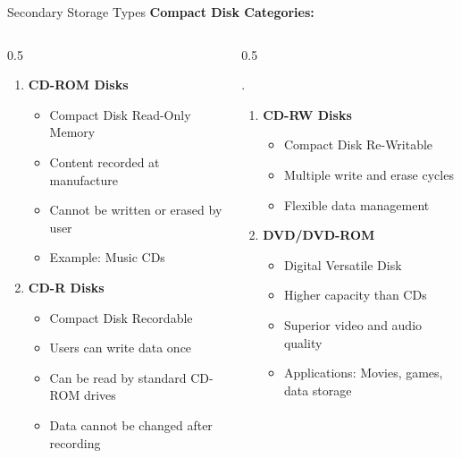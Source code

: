 \documentclass[aspectratio=169]{beamer}
\begin{document}
\begin{frame}{Secondary Storage Types}
    \textbf{Compact Disk Categories:}

    \begin{columns}
        \begin{column}{0.5\textwidth}

   \begin{enumerate}
        \item[1.] \textbf{CD-ROM Disks}
        \begin{itemize}
            \item Compact Disk Read-Only Memory
            \item Content recorded at manufacture
            \item Cannot be written or erased by user
            \item Example: Music CDs
        \end{itemize}
        
        \item[2.] \textbf{CD-R Disks}
        \begin{itemize}
            \item Compact Disk Recordable
            \item Users can write data once
            \item Can be read by standard CD-ROM drives
            \item Data cannot be changed after recording
        \end{itemize}
        \end{enumerate}
        \end{column}

        \begin{column}{0.5\textwidth} 

         . \begin{enumerate}
              \item[3.] \textbf{CD-RW Disks}
        \begin{itemize}
            \item Compact Disk Re-Writable
            \item Multiple write and erase cycles
            \item Flexible data management
        \end{itemize}
        
        \item[4.] \textbf{DVD/DVD-ROM}
        \begin{itemize}
            \item Digital Versatile Disk
            \item Higher capacity than CDs
            \item Superior video and audio quality
            \item Applications: Movies, games, data storage
        \end{itemize}
    \end{enumerate}


\end{column}
\end{columns}
\end{frame}
\end{document}
